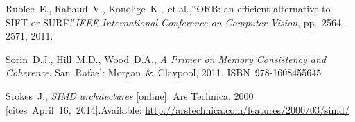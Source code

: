 {\begin{thebibliography}{99}
			Rublee~E., Rabaud~V., Konolige~K.,~et.al.,\linebreak[1]
			``ORB: an efficient alternative to SIFT or SURF.''\linebreak[1]
			\textit{IEEE International Conference on Computer Vision},
			pp.~2564--2571, 2011.
		
			Sorin~D.J., Hill~M.D., Wood~D.A.,
			\textit{A Primer on Memory Consistency and Coherence}.
			San~Rafael: Morgan~\&~Claypool, 2011. ISBN~978-1608455645
		
			Stokes~J.,
			\textit{SIMD architectures} [online]. Ars Technica, 2000 %
			[cites~April~16,~2014].\linebreak[1]
			Available: \url{http://arstechnica.com/features/2000/03/simd/}
			
		
		
		
		
		
		
		
		
		
		

\end{thebibliography}}
